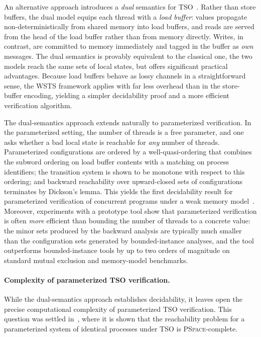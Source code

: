 An alternative approach introduces a \emph{dual} semantics for
TSO~\cite{AABN16,AABN_journal}. Rather than store buffers, the dual model
equips each thread with a \emph{load buffer}: values propagate
non-deterministically from shared memory into load buffers, and reads are
served from the head of the load buffer rather than from memory directly.
Writes, in contrast, are committed to memory immediately and tagged in the
buffer as \emph{own} messages. The dual semantics is provably equivalent to
the classical one, the two models reach the same sets of local states,
but offers significant practical advantages. Because load buffers behave as
lossy channels in a straightforward sense, the WSTS framework applies with
far less overhead than in the store-buffer encoding, yielding a simpler
decidability proof and a more efficient verification algorithm.

The dual-semantics approach extends naturally to parameterized verification.
In the parameterized setting, the number of threads is a free parameter, and
one asks whether a bad local state is reachable for \emph{any} number of
threads. Parameterized configurations are ordered by a well-quasi-ordering
that combines the subword ordering on load buffer contents with a matching on
process identifiers; the transition system is shown to be monotone with
respect to this ordering; and backward reachability over upward-closed sets of
configurations terminates by Dickson's lemma. This yields the first
decidability result for parameterized verification of concurrent programs
under a weak memory model~\cite{AABN16,AABN_journal}. Moreover, experiments
with a prototype tool show that parameterized verification is often
\emph{more} efficient than bounding the number of threads to a concrete
value: the minor sets produced by the backward analysis are typically much
smaller than the configuration sets generated by bounded-instance analyses,
and the tool outperforms bounded-instance tools by up to two orders of
magnitude on standard mutual exclusion and memory-model benchmarks.

\paragraph{Complexity of parameterized TSO verification.}
While the dual-semantics approach establishes decidability, it leaves open
the precise computational complexity of parameterized TSO verification. This
question was settled in~\cite{AAR20}, where it is shown that the reachability
problem for a parameterized system of identical processes under TSO is
\textsc{PSpace}-complete.

